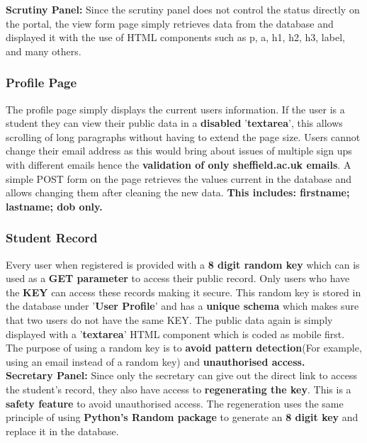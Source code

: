 \documentclass[../main.tex]{subfiles}
\begin{document}
\textbf{Scrutiny Panel:} Since the scrutiny panel does not control the status directly on the portal, the view form page simply retrieves data from the database and displayed it with the use of HTML components such as p, a, h1, h2, h3, label, and many others. 

\subsubsection{Profile Page} 
The profile page simply displays the current users information. If the user is a student they can view their public data in a \textbf{disabled} '\textbf{textarea}', this allows scrolling of long paragraphs without having to extend the page size. Users cannot change their email address as this would bring about issues of multiple sign ups with different emails hence the \textbf{validation of only sheffield.ac.uk emails}. A simple POST form on the page retrieves the values current in the database and allows changing them after cleaning the new data. \textbf{This includes: firstname; lastname; dob only. }

\subsubsection{Student Record} 
Every user when registered is provided with a\textbf{ 8 digit random key} which can is used as a \textbf{GET parameter} to access their public record. Only users who have the \textbf{KEY} can access these records making it secure. This random key is stored in the database under '\textbf{User Profile}' and has a \textbf{unique schema} which makes sure that two users do not have the same KEY. The public data again is simply displayed with a '\textbf{textarea}' HTML component which is coded as mobile first. The purpose of using a random key is to \textbf{avoid pattern detection}(For example, using an email instead of a random key) and \textbf{unauthorised access.}  \\[4mm]

\textbf{Secretary Panel:} Since only the secretary can give out the direct link to access the student's record, they also have access to \textbf{regenerating the key}. This is a \textbf{safety feature} to avoid unauthorised access. The regeneration uses the same principle of using \textbf{Python's Random package} to generate an \textbf{8 digit key} and replace it in the database. 
\end{document}
